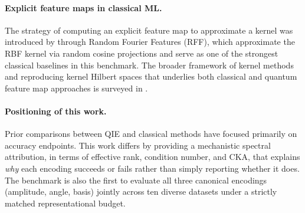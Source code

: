 \paragraph{Explicit feature maps in classical ML.}
The strategy of computing an explicit feature map to approximate a kernel
was introduced by \citet{rahimi2007} through Random Fourier Features (RFF),
which approximate the RBF kernel via random cosine projections and serve as
one of the strongest classical baselines in this benchmark.
The broader framework of kernel methods and reproducing kernel Hilbert spaces
that underlies both classical and quantum feature map approaches is surveyed
in \citet{scholkopf2002}.

\paragraph{Positioning of this work.}
Prior comparisons between QIE and classical methods have focused primarily
on accuracy endpoints.
This work differs by providing a mechanistic spectral attribution, in terms
of effective rank, condition number, and CKA, that explains \emph{why} each
encoding succeeds or fails rather than simply reporting whether it does.
The benchmark is also the first to evaluate all three canonical encodings
(amplitude, angle, basis) jointly across ten diverse datasets under a strictly
matched representational budget.
